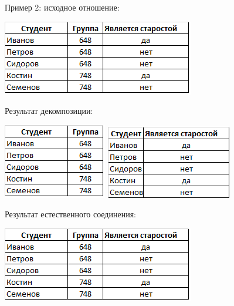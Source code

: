 \documentclass{beamer}
\begin{document}
\begin{frame}
Пример 2: исходное отношение:
\begin{center}
\includegraphics[scale=0.5]{images/ex-rasp-14.png}
\end{center}
Результат декомпозиции:
\begin{center}
\includegraphics[scale=0.5]{images/ex-rasp-15.png}
\includegraphics[scale=0.5]{images/ex-rasp-18.png}
\end{center}
Результат естественного соединения:
\begin{center}
\includegraphics[scale=0.5]{images/ex-rasp-14.png}
\end{center}
\end{frame}
\end{document}
